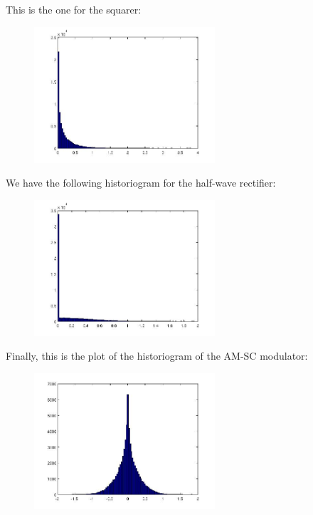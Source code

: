 \documentclass[a4paper,11pt]{article}
\begin{document}
\newpage

This is the one for the squarer:

\begin{figure}[!hp]
    \begin{center}
    \includegraphics[width=0.6\textwidth]{images/lab3_redo_34.jpg}
    \end{center}
\end{figure}

We have the following historiogram for the half-wave rectifier:

\begin{figure}[!hp]
    \begin{center}
    \includegraphics[width=0.6\textwidth]{images/lab3_redo_35.jpg}
    \end{center}
\end{figure}

\newpage

Finally, this is the plot of the historiogram of the AM-SC modulator:

\begin{figure}[!hp]
    \begin{center}
    \includegraphics[width=0.6\textwidth]{images/lab3_redo_36.jpg}
    \end{center}
\end{figure}
\end{document}
